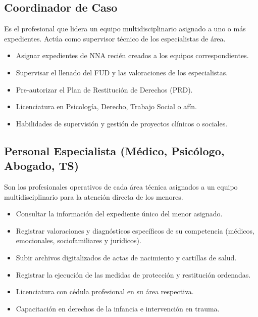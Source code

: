 \begin{Usuario}{\hypertarget{actCoordinador}{\subsection{Coordinador de Caso}}}{
		Es el profesional que lidera un equipo multidisciplinario asignado a uno o más expedientes. Actúa como supervisor técnico de los especialistas de área.
	}
	\item[Responsabilidades:] \cdtEmpty
	\begin{itemize}
		\item Asignar expedientes de NNA recién creados a los equipos correspondientes.
		\item Supervisar el llenado del FUD y las valoraciones de los especialistas.
		\item Pre-autorizar el Plan de Restitución de Derechos (PRD).
	\end{itemize}
	\item[Perfil:] \cdtEmpty
	\begin{itemize}
		\item Licenciatura en Psicología, Derecho, Trabajo Social o afín.
		\item Habilidades de supervisión y gestión de proyectos clínicos o sociales.
	\end{itemize}
\end{Usuario}

\begin{Usuario}{\hypertarget{actEspecialista}{\subsection{Personal Especialista (Médico, Psicólogo, Abogado, TS)}}}{
		Son los profesionales operativos de cada área técnica asignados a un equipo multidisciplinario para la atención directa de los menores.
	}
	\item[Responsabilidades:] \cdtEmpty
	\begin{itemize}
		\item Consultar la información del expediente único del menor asignado.
		\item Registrar valoraciones y diagnósticos específicos de su competencia (médicos, emocionales, sociofamiliares y jurídicos).
		\item Subir archivos digitalizados de actas de nacimiento y cartillas de salud.
		\item Registrar la ejecución de las medidas de protección y restitución ordenadas.
	\end{itemize}
	\item[Perfil:] \cdtEmpty
	\begin{itemize}
		\item Licenciatura con cédula profesional en su área respectiva.
		\item Capacitación en derechos de la infancia e intervención en trauma.
	\end{itemize}
\end{Usuario}

